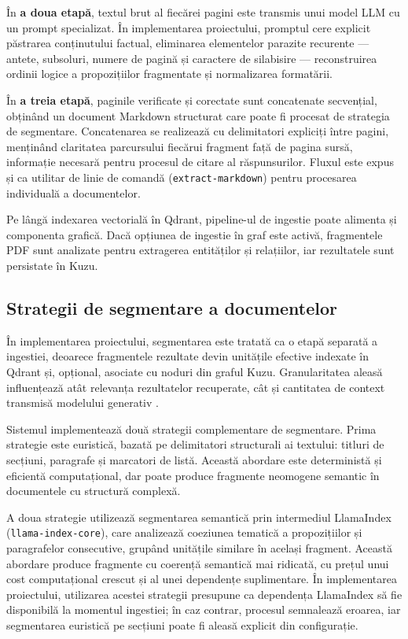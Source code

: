 \documentclass[12pt, a4paper, oneside, romanian]{teza-upb}
\begin{document}
În \textbf{a doua etapă}, textul brut al fiecărei pagini este transmis unui model LLM cu un prompt specializat. În implementarea proiectului, promptul cere explicit păstrarea conținutului factual, eliminarea elementelor parazite recurente — antete, subsoluri, numere de pagină și caractere de silabisire — reconstruirea ordinii logice a propozițiilor fragmentate și normalizarea formatării.

În \textbf{a treia etapă}, paginile verificate și corectate sunt concatenate secvențial, obținând un document Markdown structurat care poate fi procesat de strategia de segmentare. Concatenarea se realizează cu delimitatori expliciți între pagini, menținând claritatea parcursului fiecărui fragment față de pagina sursă, informație necesară pentru procesul de citare al răspunsurilor. Fluxul este expus și ca utilitar de linie de comandă (\texttt{extract-markdown}) pentru procesarea individuală a documentelor.



Pe lângă indexarea vectorială în Qdrant, pipeline-ul de ingestie poate alimenta și componenta grafică. Dacă opțiunea de ingestie în graf este activă, fragmentele PDF sunt analizate pentru extragerea entităților și relațiilor, iar rezultatele sunt persistate în Kuzu.

\subsection{Strategii de segmentare a documentelor}

În implementarea proiectului, segmentarea este tratată ca o etapă separată a ingestiei, deoarece fragmentele rezultate devin unitățile efective indexate în Qdrant și, opțional, asociate cu noduri din graful Kuzu. Granularitatea aleasă influențează atât relevanța rezultatelor recuperate, cât și cantitatea de context transmisă modelului generativ \cite{gao2023retrieval}.

Sistemul implementează două strategii complementare de segmentare. Prima strategie este euristică, bazată pe delimitatori structurali ai textului: titluri de secțiuni, paragrafe și marcatori de listă. Această abordare este deterministă și eficientă computațional, dar poate produce fragmente neomogene semantic în documentele cu structură complexă.

A doua strategie utilizează segmentarea semantică prin intermediul LlamaIndex (\texttt{llama-index-core}), care analizează coeziunea tematică a propozițiilor și paragrafelor consecutive, grupând unitățile similare în același fragment. Această abordare produce fragmente cu coerență semantică mai ridicată, cu prețul unui cost computațional crescut și al unei dependențe suplimentare. În implementarea proiectului, utilizarea acestei strategii presupune ca dependența LlamaIndex să fie disponibilă la momentul ingestiei; în caz contrar, procesul semnalează eroarea, iar segmentarea euristică pe secțiuni poate fi aleasă explicit din configurație.
\end{document}
